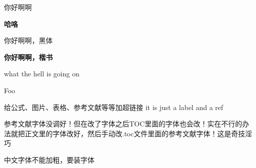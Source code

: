 \documentclass[a4paper, 12pt, oneside]{report}
\begin{document}
\newpage



\bigskip
你好啊啊

\textbf{哈咯}

{\heiti 你好啊啊，黑体}

{\kaishu \bfseries 你好啊啊，楷书}


what the hell is going on 

{\fontsize{50}{60}\selectfont Foo}


给公式、图片、表格、参考文献等等加超链接 it is just a label and a ref

参考文献字体没调好！但在改了字体之后TOC里面的字体也会改！实在不行的办法就把正文里的字体改好，然后手动改.toc文件里面的参考文献字体！这是奇技淫巧

中文字体不能加粗，要装字体
\end{document}
